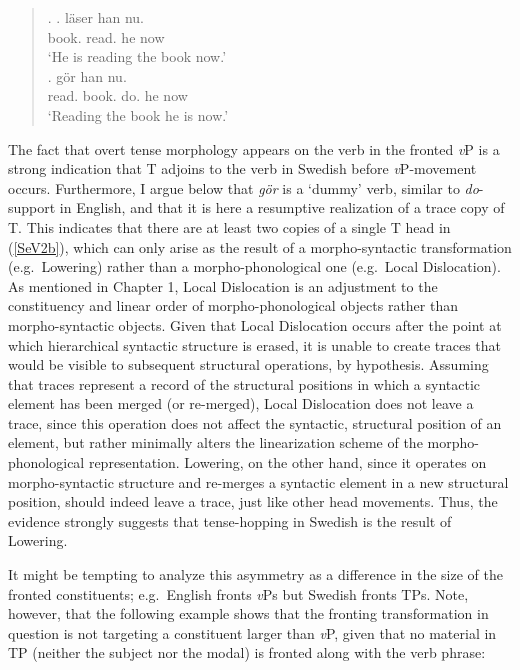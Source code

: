 \singlespacing
\begin{quote}
\begin{minipage}{5in}
\ex. \label{SeV2}
\ag.	\I[DP Boken] l\"{a}ser han nu. \label{SeV2a}\\
\hspace{1pt} book. read. he now\\
`He is reading the book now.' \\
\bg.  g\"{o}r han nu.\label{SeV2b}\\
\hspace{1pt} read. book. do. he now\\
`Reading the book he is now.' 

\end{minipage}
\end{quote}
\onehalfspacing
The fact that overt tense morphology appears on the verb in the fronted \textit{v}P is a strong indication that T adjoins to the verb in Swedish before \textit{v}P-movement occurs. Furthermore, I argue below that \textit{g\"{o}r} is a `dummy' verb, similar to \textit{do}-support in English, and that it is here a resumptive realization of a trace copy of T. This indicates that there are at least two copies of a single T head in (\ref{SeV2b}), which can only arise as the result of a morpho-syntactic transformation (e.g.\ Lowering) rather than a morpho-phonological one (e.g.\ Local Dislocation). As mentioned in Chapter 1, Local Dislocation is an adjustment to the constituency and linear order of morpho-phonological objects rather than morpho-syntactic objects. Given that Local Dislocation occurs after the point at which hierarchical syntactic structure is erased, it is unable to create traces that would be visible to subsequent structural operations, by hypothesis. Assuming that traces represent a record of the structural positions in which a syntactic element has been merged (or re-merged), Local Dislocation does not leave a trace, since this operation does not affect the syntactic, structural position of an element, but rather minimally alters the linearization scheme of the morpho-phonological representation. Lowering, on the other hand, since it operates on morpho-syntactic structure and re-merges a syntactic element in a new structural position, should indeed leave a trace, just like other head movements. Thus, the evidence strongly suggests that tense-hopping in Swedish is the result of Lowering. 

It might be tempting to analyze this asymmetry as a difference in the size of the fronted constituents; e.g.\ English fronts {\it v}Ps but Swedish fronts TPs. Note, however, that the following example shows that the fronting transformation in question is not targeting a constituent larger than \textit{v}P, given that no material in TP (neither the subject nor the modal) is fronted along with the verb phrase: 

